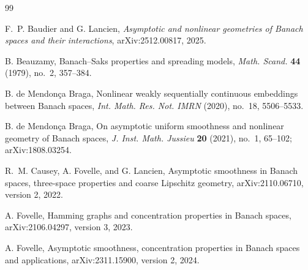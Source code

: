 \documentclass[11pt]{amsart}
\theoremstyle{definition}
\theoremstyle{remark}
\begin{document}
\begin{thebibliography}{99}

F.~P. Baudier and G. Lancien,
\emph{Asymptotic and nonlinear geometries of Banach spaces and their interactions},
arXiv:2512.00817, 2025.

B. Beauzamy,
Banach--Saks properties and spreading models,
\emph{Math. Scand.} \textbf{44} (1979), no.~2, 357--384.

B. de Mendon\c{c}a Braga,
Nonlinear weakly sequentially continuous embeddings between Banach spaces,
\emph{Int. Math. Res. Not. IMRN} (2020), no.~18, 5506--5533.

B. de Mendon\c{c}a Braga,
On asymptotic uniform smoothness and nonlinear geometry of Banach spaces,
\emph{J. Inst. Math. Jussieu} \textbf{20} (2021), no.~1, 65--102;
arXiv:1808.03254.

R.~M. Causey, A. Fovelle, and G. Lancien,
Asymptotic smoothness in Banach spaces, three-space properties and coarse Lipschitz geometry,
arXiv:2110.06710, version 2, 2022.

A. Fovelle,
Hamming graphs and concentration properties in Banach spaces,
arXiv:2106.04297, version 3, 2023.

A. Fovelle,
Asymptotic smoothness, concentration properties in Banach spaces and applications,
arXiv:2311.15900, version 2, 2024.

\end{thebibliography}
\end{document}
